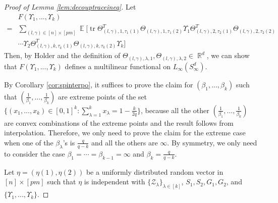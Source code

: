 \documentclass[11pt]{amsart}
\numberwithin{equation}{section}
\numberwithin{equation}{section}
\DeclareMathOperator{\E}{\mathbb{E}}
\DeclareMathOperator{\R}{\mathbb{R}}
\DeclareMathOperator*{\tr}{tr}
\theoremstyle{remark}
\theoremstyle{definition}
\begin{document}
\begin{proof}[Proof of Lemma \ref{lem:decouptraceineq}]

Let
\begin{align*}
&F(\Upsilon_1,...,\Upsilon_k)\\=&\sum_{(l,\gamma) \in [n] \times [pm]} \E[ \tr \Theta_{(l,\gamma), 1, \tau_1(1)}^T\Theta_{(l,\gamma), 1, \tau_1(2)}
	\Upsilon_1\Theta_{(l,\gamma), 2, \tau_2(1)}^T\Theta_{(l,\gamma), 2, \tau_2(2)} \\&\cdots
	\Upsilon_2\Theta_{(l,\gamma), k, \tau_k(1)}^T\Theta_{(l,\gamma), k, \tau_k(2)}\Upsilon_k]
\end{align*}
Then, by Holder and the definition of $\Theta_{(l,\gamma), \lambda, 1}, \Theta_{(l,\gamma), \lambda, 2} \in \R^d$, we can show that $F(\Upsilon_1,...,\Upsilon_k)$ defines a multilinear functional on $L_{\infty}(S_{\infty}^d)$.

\begin{comment}
Therefore, by Lemma 5.2. in \cite{brailovskaya2022universality} and standard interpolation argument,
\end{comment}

By Corollary \ref{cor:spinterpo}, it suffices to prove the claim for $(\beta_1,...,\beta_k)$ such that $(\frac{1}{\beta_1},...,\frac{1}{\beta_k})$ are extreme points of the set $\{(x_1,...,x_k) \in [0,1]^k:\sum \limits_{\lambda=1}^{k} x_{\lambda}=1-\frac{k}{2q}\}$, because all the other $(\frac{1}{\beta_1},...,\frac{1}{\beta_k})$ are convex combinations of the extreme points and the result follows from interpolation. Therefore, we only need to prove the claim for the extreme case when one of the $\beta_{\lambda}$'s is $\frac{q}{q-k}$ and all the others are $\infty$. By symmetry, we only need to consider the case $\beta_1= \cdots =\beta_{k-1}=\infty$ and $\beta_k=\frac{q}{q-k}$.


Let $\eta = (\eta(1), \eta(2))$ be a uniformly distributed random vector in $[n] \times [pm]$ such that $\eta$ is independent with $\{\mathcal{Z}_{\lambda}\}_{\lambda \in [k]}$, $S_1, S_2, G_1, G_2$, and $\{\Upsilon_1,...,\Upsilon_k\}$.
    

\end{proof}
\end{document}
